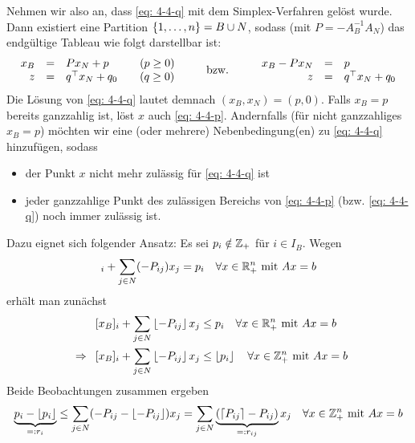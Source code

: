 Nehmen wir also an, dass \eqref{eq: 4-4-q} mit dem Simplex-Verfahren gelöst wurde. Dann existiert eine Partition $\left\{ 1, \dots, n \right\} = B \cup N$, sodass (mit $P = -A_B^{-1} A_N$) das endgültige Tableau wie folgt darstellbar ist:
\begin{equation*}
	\begin{array}{rcll}
		x_B &=& Px_N + p \quad &(p \ge 0) \\
		z   &=& q^{\top} x_N + q_0  \quad &(q \ge 0)
	\end{array}
	\qquad \text{ bzw. } \qquad 
	\begin{array}{rcl}
		x_B - Px_N &=& p \\
		z &=& q^{\top} x_N + q_0
	\end{array}
\end{equation*}
Die Lösung von \eqref{eq: 4-4-q} lautet demnach $(x_B, x_N) = (p,0)$. Falls $x_B = p$ bereits ganzzahlig ist, löst $x$ auch \eqref{eq: 4-4-p}. Andernfalls (für nicht ganzzahliges $x_B = p$) möchten wir eine (oder mehrere) Nebenbedingung(en) zu \eqref{eq: 4-4-q} hinzufügen, sodass
\begin{itemize}[nolistsep, topsep=-\parskip]
	\item der Punkt $x$ nicht mehr zulässig für \eqref{eq: 4-4-q} ist
	\item jeder ganzzahlige Punkt des zulässigen Bereichs von \eqref{eq: 4-4-p} (bzw. \eqref{eq: 4-4-q}) noch immer zulässig ist.
\end{itemize}
Dazu eignet sich folgender Ansatz: Es sei $p_i \notin \mathbb{Z}_+$ für $i \in I_B$. Wegen
\begin{equation*}
	[x_B]_i + \sum_{j \in N} (-P_{ij}) x_j = p_i \quad \forall x \in \Rn_+ \mit Ax = b
\end{equation*}
erhält man zunächst 
\begin{equation*}
	\begin{aligned}
		[x_B]_i + \sum_{j \in N} \left\lfloor -P_{ij} \right\rfloor x_j &\le p_i \quad \forall x \in \Rn_+ \mit Ax = b \\
		\follows [x_B]_i + \sum_{j \in N} \left\lfloor -P_{ij} \right\rfloor x_j &\le \left\lfloor p_i \right\rfloor \quad \forall x \in \Z^n_+ \mit Ax = b
	\end{aligned}
\end{equation*}
Beide Beobachtungen zusammen ergeben
\begin{equation*}
	\underbrace{p_i - \left\lfloor p_i \right\rfloor}_{\mathrel{=:} r_i} \le \sum_{j \in N} (-P_{ij} - \left\lfloor - P_{ij} \right\rfloor) x_j = \sum_{j \in N} \underbrace{(\left\lceil P_{ij} \right\rceil - P_{ij})}_{\mathrel{=:} r_{ij}} x_j \quad \forall x \in \mathbb{Z}_+^n \text{ mit } Ax = b
\end{equation*}

